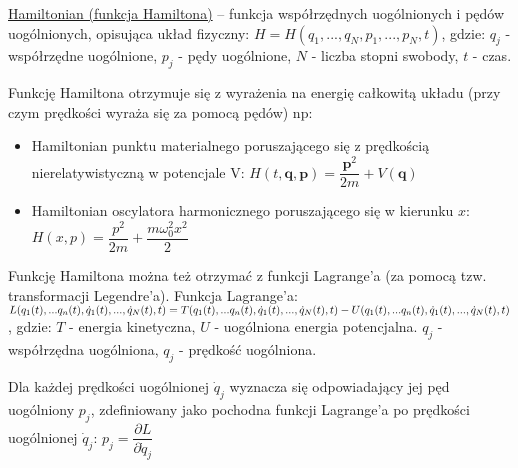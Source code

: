 \underline{Hamiltonian (funkcja Hamiltona)} – funkcja współrzędnych uogólnionych i pędów uogólnionych, opisująca układ fizyczny:\newline
$ H = H(q_1,...,q_N,p_1,...,p_N,t) $, gdzie:\newline
$ q_j $ - współrzędne uogólnione,\newline
$ p_j $ - pędy uogólnione,\newline
$ N $ - liczba stopni swobody,\newline
$ t $ - czas.

Funkcję Hamiltona otrzymuje się z wyrażenia na energię całkowitą układu (przy czym prędkości wyraża się za pomocą pędów) np:

\begin{itemize}
	\item Hamiltonian punktu materialnego poruszającego się z prędkością nierelatywistyczną w potencjale V:\newline
	$ H(t,\textbf{q},\textbf{p}) = \dfrac{\textbf{p}^2}{2m} + V(\textbf{q}) $
	\item Hamiltonian oscylatora harmonicznego poruszającego się w kierunku $ x $:\newline
	$ H(x, p) = \dfrac{p^2}{2m} + \dfrac{m\omega_0^2x^2}{2} $
\end{itemize}

Funkcję Hamiltona można też otrzymać z funkcji Lagrange’a (za pomocą tzw. transformacji Legendre’a). Funkcja Lagrange'a:\newline
$ L(q_1(t),...q_n(t),\dot{q}_1(t),...,\dot{q}_N(t),t) = \\ T(q_1(t),...q_n(t),\dot{q}_1(t),...,\dot{q}_N(t),t) - U(q_1(t),...q_n(t),\dot{q}_1(t),...,\dot{q}_N(t),t) $, gdzie:\newline
$ T $ - energia kinetyczna,\newline
$ U $ - uogólniona energia potencjalna.\newline
$ q_j $ - współrzędna uogólniona,\newline
$ {q}_j $ - prędkość uogólniona.\newline

Dla każdej prędkości uogólnionej $ \dot{q}_j $ wyznacza się odpowiadający jej pęd uogólniony $ p_j $, zdefiniowany jako pochodna funkcji Lagrange’a po prędkości uogólnionej $ \dot{q}_j $:\newline
$ p_j = \dfrac{\partial L}{\partial \dot{q}_j} $

